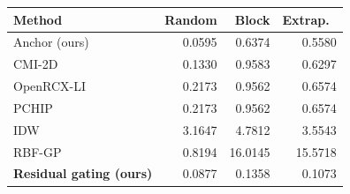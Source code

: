 \small
\begin{tabular}{lrrr}\toprule
Method & Random & Block & Extrap.\ \\\midrule
Anchor (ours) & 0.0595 & 0.6374 & 0.5580 \\
CMI-2D & 0.1330 & 0.9583 & 0.6297 \\
OpenRCX-LI & 0.2173 & 0.9562 & 0.6574 \\
PCHIP & 0.2173 & 0.9562 & 0.6574 \\
IDW & 3.1647 & 4.7812 & 3.5543 \\
RBF-GP & 0.8194 & 16.0145 & 15.5718 \\
\textbf{Residual gating (ours)} & 0.0877 & 0.1358 & 0.1073 \\
\bottomrule\end{tabular}
